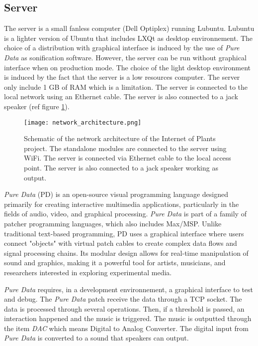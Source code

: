 \subsection{Server}

The server is a small fanless computer (Dell Optiplex) running Lubuntu. Lubuntu is a lighter version of Ubuntu that includes LXQt as desktop environnement. The choice of a distribution with graphical interface is induced by the use of \textit{Pure Data} as sonification software. However, the server can be run without graphical interface when on production mode. The choice of the light desktop environment is induced by the fact that the server is a low resources computer. The server only include 1 GB of RAM which is a limitation. The server is connected to the local network using an Ethernet cable. The server is also connected to a jack speaker (ref figure \ref{fig:network_architecture}).

\begin{figure}[h]
    \centering
    \texttt{[image: network\_architecture.png]}
    \caption{Schematic of the network architecture of the Internet of Plants project. The standalone modules are connected to the server using WiFi. The server is connected via Ethernet cable to the local access point. The server is also connected to a jack speaker working as output.}
    \vspace{0.1cm}
    \label{fig:network_architecture}
\end{figure}



\textit{Pure Data} (PD) is an open-source visual programming language designed primarily for creating interactive multimedia applications, particularly in the fields of audio, video, and graphical processing.
\textit{Pure Data} is part of a family of patcher programming languages, which also includes Max/MSP.
Unlike traditional text-based programming, PD uses a graphical interface where users connect
"objects" with virtual patch cables to create complex data flows and signal processing chains.
Its modular design allows for real-time manipulation of sound and graphics, making it a powerful
tool for artists, musicians, and researchers interested in exploring experimental media.

\textit{Pure Data} requires, in a development environnement, a graphical interface to test and debug.
The \textit{Pure Data} patch receive the data through a TCP socket. The data is processed through several
operations. Then, if a threshold is passed, an interaction happened and the music is triggered.
The music is outputted through the item \textit{DAC} which means Digital to Analog Converter.
The digital input from \textit{Pure Data} is converted to a sound that speakers can output.

